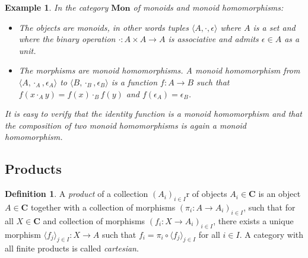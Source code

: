 \documentclass[11pt,oneside,draft]{book}
\newtheorem{example}[theorem]{Example}
\theoremstyle{definition}
\newtheorem{definition}[theorem]{Definition}
\begin{document}
\begin{example} \label{ex:mon} %
In the category $\mathbf{Mon}$ of
monoids and monoid homomorphisms:
\begin{itemize}
  \item The objects are \emph{monoids},
    in other words tuples $\langle A, {\cdot}, \epsilon \rangle$
    where $A$ is a set and
    where the binary operation
    ${\cdot} : A \times A \rightarrow A$ is associative and
    admits $\epsilon \in A$ as a unit.
  \item The morphisms are \emph{monoid homomorphisms}.
    A monoid homomorphism from
    $\langle A, {\cdot_A}, \epsilon_A \rangle$ to
    $\langle B, {\cdot_B}, \epsilon_B \rangle$ is
    a function $f : A \rightarrow B$ such that
    $f(x \cdot_A y) = f(x) \cdot_B f(y)$ and
    $f(\epsilon_A) = \epsilon_B$.
\end{itemize}
It is easy to verify that the identity function
is a monoid homomorphism and that
the composition of two monoid homomorphisms
is again a monoid homomorphism.
\end{example}


\subsection{Products} %

\begin{definition} \label{def:prod}
A \emph{product} of a collection $(A_i)_{i \in I}$r
of objects $A_i \in \mathbf{C}$
is an object $A \in \mathbf{C}$
together with a collection of morphisms
$(\pi_i : A \rightarrow A_i)_{i \in I}$,
such that for all $X \in \mathbf{C}$ and collection of morphisms
$(f_i : X \rightarrow A_i)_{i \in I}$,
there exists a unique morphism
$\langle f_j \rangle_{j \in I} : X \rightarrow A$
such that
$f_i = \pi_i \circ \langle f_j \rangle_{j \in I}$
for all $i \in I$.
A category with all finite products is called \emph{cartesian}.
\end{definition}
\end{document}
